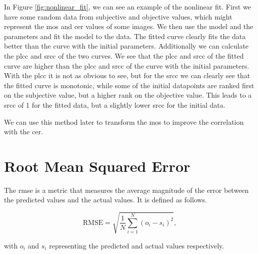 In Figure \ref{fig:nonlinear_fit}, we can see an example of the nonlinear fit.
First we have some random data from subjective and objective values, which might represent the \gls{mos} and \gls{cer} values of some images.
We then use the model and the parameters and fit the model to the data.
The fitted curve clearly fits the data better than the curve with the initial parameters.
Additionally we can calculate the \gls{plcc} and \gls{srcc} of the two curves.
We see that the \gls{plcc} and \gls{srcc} of the fitted curve are higher than the \gls{plcc} and \gls{srcc} of the curve with the initial parameters.
With the \gls{plcc} it is not as obvious to see, but for the \gls{srcc} we can clearly see that the fitted curve is monotonic, while some of the initial datapoints are ranked first on the subjective value, but a higher rank on the objective value.
This leads to a \gls{srcc} of 1 for the fitted data, but a slightly lower \gls{srcc} for the initial data.

We can use this method later to transform the \gls{mos} to improve the correlation with the \gls{cer}.

\section{Root Mean Squared Error}
\label{sec:rmse}

The \gls{rmse} is a metric that measures the average magnitude of the error between the predicted values and the actual values.
It is defined as follows.

\begin{equation}
    \textrm{RMSE} = \sqrt{\frac{1}{N}\sum_{i=1}^{N}{(o_i - s_i)^2}},
    \label{eq:rmse}
\end{equation}

with $o_i$ and $s_i$ representing the predicted and actual values respectively.

